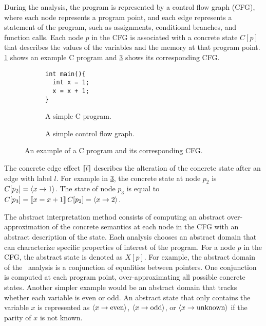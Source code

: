 During the analysis, the program is represented by a control flow graph (CFG), where each node represents a program point, and each edge represents a statement of the program,
such as assignments, conditional branches, and function calls.
Each node $p$ in the CFG is associated with a concrete state $C[p]$ that describes the values of the variables and the memory at that program point.
\cref{fig:example-C-program} shows an example C program and \cref{fig:example-CFG} shows its corresponding CFG.

\begin{figure}\begin{subfigure}{0.45\textwidth}
\centering
    \begin{verbatim}
int main(){
  int x = 1;
  x = x + 1;
}
\end{verbatim}
    \caption{A simple C program.}\label{fig:example-C-program}
  \end{subfigure}
  \begin{subfigure}{0.45\textwidth}
    \centering
    \caption{A simple control flow graph.}\label{fig:example-CFG}
  \end{subfigure}

  \caption[An example of a control flow graph.]{An example of a C program and its corresponding CFG.}


\end{figure}

The concrete edge effect $\llbracket l\rrbracket$ describes the alteration of the concrete state after an edge with label $l$.
For example in \cref{fig:example-CFG}, the concrete state at node $p_2$ is $C[p_2] = \langle x \rightarrow 1\rangle$.
The state of node $p_3$ is equal to $C[p_3] = \llbracket x = x+1\rrbracket\,C[p_2] = \langle x \rightarrow 2\rangle$.

The abstract interpretation method consists of computing an abstract over-approximation of the concrete semantics at each node in the CFG with an abstract description of the state.
Each analysis chooses an abstract domain that can characterize specific properties of interest of the program.
For a node $p$ in the CFG, the abstract state is denoted as $X[p]$.
For example, the abstract domain of the \cpo\ analysis is a conjunction of equalities between pointers.
One conjunction is computed at each program point, over-approximating all possible concrete states.
Another simpler example would be an abstract domain that tracks whether each variable is even or odd.
An abstract state that only contains the variable $x$ is represented as $\langle x \rightarrow \text{even}\rangle$, $\langle x \rightarrow \text{odd}\rangle$,  or $\langle x \rightarrow \text{unknown}\rangle$ if the parity of $x$ is not known.

